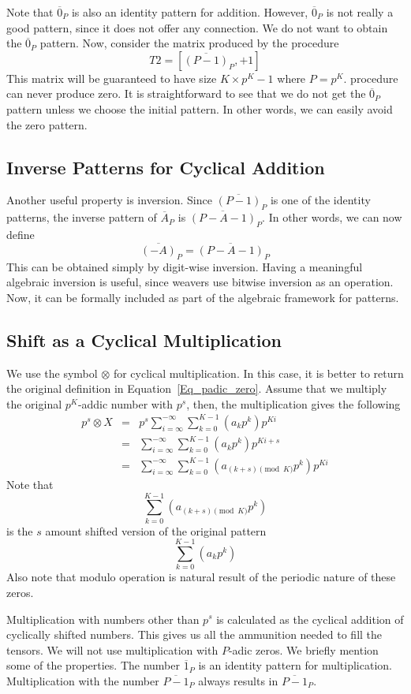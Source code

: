 \documentclass[times,twocolumn,final]{elsarticle}
\begin{document}
Note that $\overline{0}_P$ is also an identity pattern for addition. However, $\overline{0}_P$ is not really a good pattern, since it does not offer any connection. We do not want to obtain the $\overline{0}_P$ pattern. Now, consider the matrix produced by the procedure
$$ T2 = [\overline{(P-1)}_P, +1 ]$$
This matrix will be guaranteed to have size $K \times p^K-1$ where $P=p^K$. procedure can never produce zero. It is straightforward to see that we do not get the $\overline{0}_P$ pattern unless we choose the initial pattern. In other words, we can easily avoid the zero pattern. 

\subsection{Inverse Patterns for Cyclical Addition}

Another useful property is inversion. Since $\overline{(P-1)}_P$ is one of the identity patterns, the inverse pattern of $\overline{A}_P$ is $\overline{(P-A-1)}_P$. In other words, we can now define
$$\overline{(-A)}_P = \overline{(P-A-1)}_P$$
This can be obtained simply by digit-wise inversion. Having a meaningful algebraic inversion is useful, since weavers use bitwise inversion as an operation. Now, it can be formally included as part of the algebraic framework for patterns. 

\subsection{Shift as a Cyclical Multiplication}

We use the symbol $\otimes$ for cyclical multiplication. 
In this case, it is better to return the original definition in Equation~\ref{Eq_padic_zero}. Assume that we multiply the original $p^K$-addic number with $p^s$, then, the multiplication gives the following  
\begin{eqnarray}
p^s \otimes  X &=& p^s \sum_{i=\infty}^{-\infty} \sum_{k=0}^{K-1} (a_k p^k) p^{Ki} \nonumber\\
&=&  \sum_{i=\infty}^{-\infty} \sum_{k=0}^{K-1} (a_k p^k) p^{Ki+s} \nonumber\\
&=&  \sum_{i=\infty}^{-\infty} \sum_{k=0}^{K-1} (a_{(k+s)\! \! \pmod{K}} p^k) p^{Ki} 
\label{Eq_padic_zero_shift}
\end{eqnarray} 
Note that 
$$\sum_{k=0}^{K-1} (a_{(k+s)\! \! \pmod{K}} p^k)$$
is the $s$ amount shifted version of the original pattern 
$$\sum_{k=0}^{K-1} (a_{k} p^k)$$
Also note that modulo operation is natural result of the periodic nature of these zeros. 

Multiplication with numbers other than $p^s$ is calculated as the cyclical addition of cyclically shifted numbers. This gives us all the ammunition needed to fill the tensors. We will not use multiplication with $P$-adic zeros. We briefly mention some of the properties. The number $\overline{1}_P$ is an identity pattern for multiplication. Multiplication with the number $\overline{P-1}_P$ always results in $\overline{P-1}_P$. 
\end{document}
